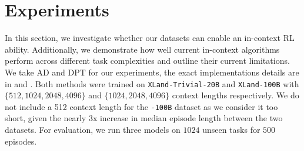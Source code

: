 \documentclass{article}
\begin{document}


\section{Experiments}
\label{exp}


In this section, we investigate whether our datasets can enable an in-context RL ability. Additionally, we demonstrate how well current in-context algorithms perform across different task complexities and outline their current limitations. We take AD \citep{laskin2022context} and DPT \citep{lee2023supervised} for our experiments, the exact implementations details are in  and . Both methods were trained on \texttt{XLand-Trivial-20B} and \texttt{XLand-100B} with $\{512, 1024, 2048, 4096\}$ and $\{1024, 2048, 4096\}$ context lengths respectively. We do not include a 512 context length for the \texttt{-100B} dataset as we consider it too short, given the nearly 3x increase in median episode length between the two datasets. For evaluation, we run three models on $1024$ unseen tasks for $500$ episodes.
\end{document}

